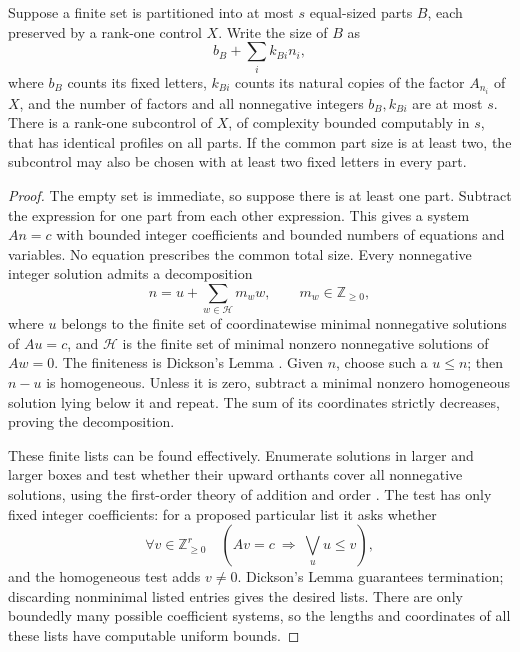 \begin{lemma}\label{n:profiles}
Suppose a finite set is partitioned into at most $s$ equal-sized parts
$B$, each preserved by a rank-one control $X$.  Write the size of $B$ as
\[
 b_B+\sum_i k_{Bi}n_i,
\]
where $b_B$ counts its fixed letters, $k_{Bi}$ counts its natural copies
of the factor $A_{n_i}$ of $X$, and the number of factors and all
nonnegative integers $b_B,k_{Bi}$ are at most $s$.  There is a rank-one
subcontrol of $X$, of complexity bounded computably in $s$, that has
identical profiles on all parts.  If the common part size is at least
two, the subcontrol may also be chosen with at least two fixed letters
in every part.
\end{lemma}

\begin{proof}
The empty set is immediate, so suppose there is at least one part.
Subtract the expression for one part from each other expression.  This
gives a system $An=c$ with bounded integer coefficients and bounded
numbers of equations and variables.  No equation prescribes the
common total size.  Every nonnegative integer solution admits a
decomposition
\begin{equation}\label{n:profile-decomposition}
 n=u+\sum_{w\in\mathcal H}m_w w,\qquad m_w\in\mathbb Z_{\ge0},
\end{equation}
where $u$ belongs to the finite set of coordinatewise minimal
nonnegative solutions of $Au=c$, and $\mathcal H$ is the finite set
of minimal nonzero nonnegative solutions of $Aw=0$.
The finiteness is Dickson's Lemma \citep{Dickson1913}.  Given $n$, choose
such a $u\le n$; then $n-u$ is homogeneous.  Unless it is zero, subtract
a minimal nonzero homogeneous solution lying below it and repeat.
The sum of its coordinates strictly decreases, proving the decomposition.

These finite lists can be found effectively.  Enumerate solutions in
larger and larger boxes and test whether their upward orthants cover
all nonnegative solutions, using the first-order theory of addition
and order \citep{Presburger1929}.  The test has only fixed integer
coefficients: for a proposed particular list it asks whether
\[
 \forall v\in\mathbb Z_{\ge0}^r\quad
 (Av=c\ \Longrightarrow\ \bigvee_u u\le v),
\]
and the homogeneous test adds $v\ne0$.  Dickson's Lemma guarantees
termination; discarding nonminimal listed entries gives the desired
lists.  There are only boundedly many possible coefficient systems,
so the lengths and coordinates of all these lists have computable
uniform bounds.


\end{proof}
